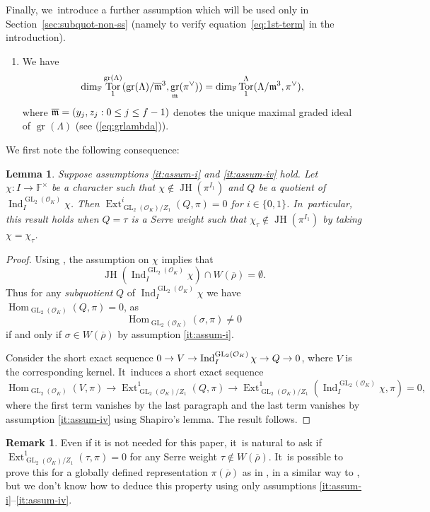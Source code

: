 \documentclass[JEP,XML,SOM,Unicode,NoFloatCountersInSection, NoEqCountersInSection,published]{cedram}
\let\ovl\overline
\newcommand{\F}{\mathbb{F}}
\newcommand{\cO}{\mathcal{O}}
\newcommand{\brho}{\overline{\rho}}
\DeclareMathOperator{\Ext}{Ext}
\DeclareMathOperator{\GL}{GL}
\DeclareMathOperator{\gr}{gr}
\DeclareMathOperator{\Hom}{Hom}
\DeclareMathOperator{\Ind}{Ind}
\DeclareMathOperator{\JH}{\mathrm{JH}}
\DeclareMathOperator{\Tor}{Tor}
\theoremstyle{plain}
\newtheorem{lem}[prop]{Lemma}
\theoremstyle{definition}
\newtheorem{rem}[prop]{Remark}
\begin{document}
Finally, we~introduce a further assumption which will be used only in Section~\ref{sec:subquot-non-ss} (namely to verify equation~\eqref{eq:1st-term} in the introduction).
\begin{enumerate}{\setcounter{enumi}{4}}
\item
\label{it:assum-v}

We have
\[
\dim_\F\Tor_1^{\gr(\Lambda)}(\gr(\Lambda)/\ovl\m^3,\gr_\m(\pi^{\vee})) = \dim_\F \Tor_1^{\Lambda}(\Lambda/\m^3,\pi^{\vee}),
\]
where $\ovl\m = (y_j,z_j: 0 \le j \le f-1)$ denotes the unique maximal graded ideal of $\gr(\Lambda)$ (see (\ref{eq:grlambda})).
\end{enumerate}

We first note the following consequence:

\begin{lem}\label{lem:Ext1-Serre}
{Suppose assumptions \eqref{it:assum-i} and \eqref{it:assum-iv} hold.}
Let $\chi:I\to \F^{\times}$ be a character such that $\chi\notin \JH(\pi^{I_1})$ and $Q$ be a quotient of $\Ind_I^{\GL_2(\cO_K)}\chi$. Then $\Ext^i_{\GL_2(\cO_K)/Z_1}(Q,\pi)=0$ for $i\in\{0,1\}$. In~particular, this result holds when $Q=\tau$ is a Serre weight such that $\chi_{\tau}\notin \JH(\pi^{I_1})$ by taking $\chi=\chi_\tau$.
\end{lem}

\begin{proof}
Using \cite[Prop.\,4.2]{breuil-buzzati}, the assumption on $\chi$ implies that
\[
\JH(\Ind_I^{\GL_2(\cO_K)}\chi)\cap W(\brho)=\emptyset.
\]
Thus for any \emph{subquotient} $Q$ of $\Ind_I^{\GL_2(\cO_K)}\chi$ we have $\Hom_{\GL_2(\cO_K)}(Q,\pi)=0$, as
\[
\Hom_{\GL_2(\cO_K)}(\sigma,\pi)\neq 0
\]
if and only if $\sigma\in W(\brho)$ by assumption \eqref{it:assum-i}.

Consider the short exact sequence $0\to V\to \Ind_I^{\GL_2(\cO_K)}\chi\to Q\ra0$, where $V$ is the corresponding kernel. It~induces a short exact sequence
\[\textstyle
\Hom_{\GL_2(\cO_K)}(V,\pi)\to \Ext^1_{\GL_2(\cO_K)/Z_1}(Q,\pi)\to \Ext^1_{\GL_2(\cO_K)/Z_1}(\Ind_I^{\GL_2(\cO_K)}\chi,\pi)=0,
\]
where the first term vanishes by the last paragraph and the last term vanishes by assumption \eqref{it:assum-iv} using Shapiro's lemma. The result follows.
\end{proof}
\begin{rem}
Even if it is not needed for this paper, it~is natural to ask if $\Ext^1_{\GL_2(\cO_K)/Z_1}(\tau,\pi)=0$ for any Serre weight $\tau\notin W(\brho)$. It~is possible to prove this for a globally defined representation $\pi(\brho)$ as in \cite[\S 2.6]{BHHMS4}, in a similar way to \cite[Prop.\,2.6.3]{BHHMS4}, but we don't know how to deduce this property using only assumptions \eqref{it:assum-i}--\eqref{it:assum-iv}.
\end{rem}
\end{document}
